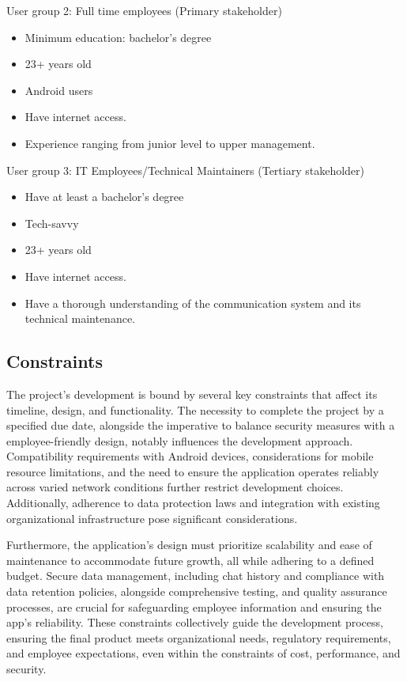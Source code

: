 \documentclass[]{article}
\begin{document}
\noindent User group 2: Full time employees (Primary stakeholder)
\begin{itemize}
    \item Minimum education: bachelor’s degree
    \item 23+ years old
    \item Android users
    \item Have internet access.
    \item Experience ranging from junior level to upper management.
\end{itemize}

\noindent User group 3: IT Employees/Technical Maintainers (Tertiary stakeholder)
\begin{itemize}
    \item Have at least a bachelor’s degree
    \item Tech-savvy
    \item 23+ years old
    \item Have internet access.
    \item Have a thorough understanding of the communication system and its technical maintenance.
\end{itemize}

\subsection{Constraints}
\label{sub:constraints}
\hspace{5mm}The project's development is bound by several key constraints that affect its timeline, design, and functionality. The necessity to complete the project by a specified due date, alongside the imperative to balance security measures with a employee-friendly design, notably influences the development approach. Compatibility requirements with Android devices, considerations for mobile resource limitations, and the need to ensure the application operates reliably across varied network conditions further restrict development choices. Additionally, adherence to data protection laws and integration with existing organizational infrastructure pose significant considerations.

\hspace{5mm}Furthermore, the application's design must prioritize scalability and ease of maintenance to accommodate future growth, all while adhering to a defined budget. Secure data management, including chat history and compliance with data retention policies, alongside comprehensive testing, and quality assurance processes, are crucial for safeguarding employee information and ensuring the app's reliability. These constraints collectively guide the development process, ensuring the final product meets organizational needs, regulatory requirements, and employee expectations, even within the constraints of cost, performance, and security.
\end{document}
